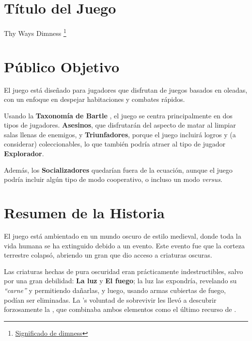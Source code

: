 \begin{multicols}{2}

    \section{Título del Juego}
    Thy Ways Dimness \footnote{\href{https://dictionary.cambridge.org/es/diccionario/ingles/dimness}{Significado de dimness}}


    \section{Público Objetivo}
    El juego está diseñado para jugadores que disfrutan de juegos basados en oleadas, con un enfoque en despejar habitaciones y combates rápidos.

    Usando la \textbf{Taxonomía de Bartle} \cite{bartle1996}, el juego se centra principalmente en dos tipos de jugadores. \textbf{Asesinos}, que disfrutarán del aspecto de matar al limpiar salas llenas de enemigos, y \textbf{Triunfadores}, porque el juego incluirá logros y (a considerar) coleccionables, lo que también podría atraer al tipo de jugador \textbf{Explorador}.

    Además, los \textbf{Socializadores} quedarían fuera de la ecuación, aunque el juego podría incluir algún tipo de modo cooperativo, o incluso un modo \textit{versus}.


    \section{Resumen de la Historia} \label{sec:story}
    El juego está ambientado en un mundo oscuro de estilo medieval, donde toda la vida humana se ha extinguido debido a un evento. Este evento fue que la corteza terrestre colapsó, abriendo un gran \hole que dio acceso a criaturas oscuras.

    Las criaturas hechas de pura oscuridad eran prácticamente indestructibles, salvo por una gran debilidad: \textbf{La luz} y \textbf{El fuego}; la luz las expondría, revelando su \textit{“carne”} y permitiendo dañarlas, y luego, usando armas cubiertas de fuego, podían ser eliminadas. La \humanity's voluntad de sobrevivir les llevó a descubrir forzosamente la \gunpowder, que combinaba ambos elementos como el último recurso de \humanity.


\end{multicols}

